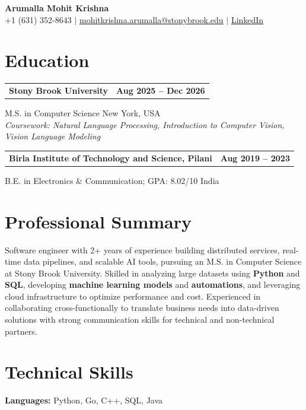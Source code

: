 \documentclass[letterpaper,10pt]{article}
\makeatletter
\newcommand{\entry}[2]{%
  \noindent
  \begin{tabularx}{\linewidth}
    {@{}>{\raggedright\arraybackslash}X@{\hspace{6pt}}r@{}}
    \textbf{#1} & #2
  \end{tabularx}\par
}
\makeatother
\begin{document}
\begin{center}
    {\LARGE\bfseries Arumalla Mohit Krishna}\\[3pt]
    +1 (631) 352-8643 $|$
    \href{mailto:mohitkrishna.arumalla@stonybrook.edu}
    {mohitkrishna.arumalla@stonybrook.edu} $|$
    \href{https://linkedin.com/in/mohit-krishna-arumalla}
    {LinkedIn}
\end{center}
\vspace{-8pt}

\section{Education}

\entry
  {\textbf{Stony Brook University}}
  {\textbf{Aug 2025 -- Dec 2026}}

M.S. in Computer Science \hfill New York, USA\\
\textit{
Coursework: Natural Language Processing,
Introduction to Computer Vision, Vision Language Modeling
}
\vspace{3pt}

\entry
  {\textbf{Birla Institute of Technology and Science, Pilani}}
  {\textbf{Aug 2019 -- 2023}}

B.E. in Electronics \& Communication; GPA: 8.02/10 \hfill India
\section{Professional Summary}

Software engineer with 2+ years of experience building distributed services,
real-time data pipelines, and scalable AI tools, pursuing an M.S. in Computer
Science at Stony Brook University. Skilled in analyzing large datasets using
\textbf{Python} and \textbf{SQL}, developing \textbf{machine learning models} and
\textbf{automations}, and leveraging cloud infrastructure to optimize performance
and cost. Experienced in collaborating cross-functionally to translate business
needs into data-driven solutions with strong communication skills for technical and
non-technical partners.

\section{Technical Skills}

\textbf{Languages:}
Python, Go, C++, SQL, Java\\
\end{document}
